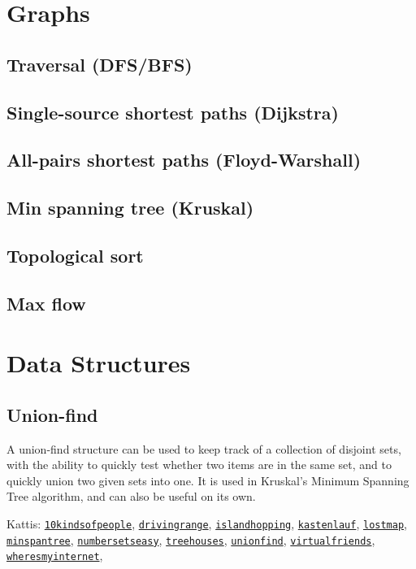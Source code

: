 \documentclass{article}
\newcommand{\kattis}[1]{\href{https://open.kattis.com/problems/#1}{\texttt{#1}}}
\begin{document}
\section{Graphs}

\subsection{Traversal (DFS/BFS)}

\subsection{Single-source shortest paths (Dijkstra)}

\subsection{All-pairs shortest paths (Floyd-Warshall)}

\subsection{Min spanning tree (Kruskal)} \label{sec:kruskal}

\subsection{Topological sort}

\subsection{Max flow}

\section{Data Structures}

\subsection{Union-find}

A union-find structure can be used to keep track of a collection of
disjoint sets, with the ability to quickly test whether two items are
in the same set, and to quickly union two given sets into one.  It is
used in Kruskal's Minimum Spanning Tree algorithm, and can also be
useful on its own.

Kattis: \kattis{10kindsofpeople}, \kattis{drivingrange},
\kattis{islandhopping}, \kattis{kastenlauf}, \kattis{lostmap},
\kattis{minspantree}, \kattis{numbersetseasy}, \kattis{treehouses},
\kattis{unionfind}, \kattis{virtualfriends},
\kattis{wheresmyinternet},
\end{document}
